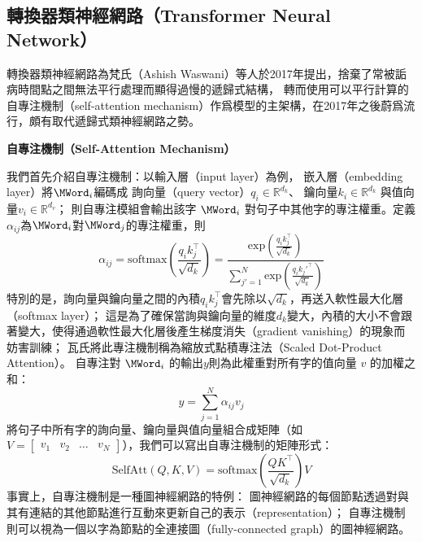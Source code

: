 \subsection{轉換器類神經網路（Transformer Neural Network）}
轉換器類神經網路為梵氏（Ashish Waswani）等人\cite{NIPS2017_7181}於2017年提出，捨棄了常被詬病時間點之間無法平行處理而顯得過慢的遞歸式結構，
轉而使用可以平行計算的自專注機制（self-attention mechanism）作爲模型的主架構，在2017年之後蔚爲流行，頗有取代遞歸式類神經網路之勢。

\vspace{12pt}
\noindent\textbf{自專注機制（Self-Attention Mechanism）}
\vspace{4pt}

我們首先介紹自專注機制：以輸入層（input layer）為例，
嵌入層（embedding layer）將$\MWord_{i}$編碼成
詢向量（query vector）$q_i \in \mathbb{R}^{d_k}$、
鑰向量$k_i \in \mathbb{R}^{d_k}$
與值向量$v_i\in \mathbb{R}^{d_v}$；
則自專注模組會輸出該字 $\MWord_{i}$ 對句子中其他字的專注權重。定義$\alpha_{ij}$為$\MWord_{i}$對$\MWord_{j}$的專注權重，則
\begin{equation}
    \alpha_{ij} = \mathrm{softmax} \left( \frac{q_i k_j^{\top}}{\sqrt{d_k}} \right)
                = \frac{\mathrm{exp}(\frac{q_i k_j^{\top}}{\sqrt{d_k}})}{\sum_{j'=1}^{N} \mathrm{exp}(\frac{q_i k_j'^{\top}}{\sqrt{d_k}})}
\end{equation}
特別的是，詢向量與鑰向量之間的內積$q_i k_j^{\top}$會先除以$\sqrt{d_k}$，再送入軟性最大化層（softmax layer）；
這是為了確保當詢與鑰向量的維度$d_k$變大，內積的大小不會跟著變大，使得通過軟性最大化層後產生梯度消失（gradient vanishing）的現象而妨害訓練；
瓦氏將此專注機制稱為縮放式點積專注法（Scaled Dot-Product Attention）。
自專注對 $\MWord_{i}$ 的輸出$y$則為此權重對所有字的值向量 $v$ 的加權之和：
\begin{equation}
    y = \sum\limits_{j=1}^{N} \alpha_{ij} v_j
\end{equation}
將句子中所有字的詢向量、鑰向量與值向量組合成矩陣（如
$
V =
\begin{bmatrix}
    v_1   & v_2   & \dots & v_N
\end{bmatrix}
$），我們可以寫出自專注機制的矩陣形式：
\begin{equation}
    \mathrm{SelfAtt}(Q, K, V) = \mathrm{softmax} \left(\frac{Q K^{\top}}{\sqrt{d_{k}}} \right) V
\end{equation}
事實上，自專注機制是一種圖神經網路的特例：
圖神經網路的每個節點透過對與其有連結的其他節點進行互動來更新自己的表示（representation）；
自專注機制則可以視為一個以字為節點的全連接圖（fully-connected graph）的圖神經網路。

